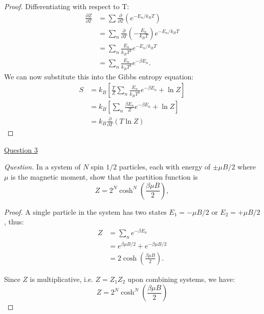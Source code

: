 \documentclass[11pt]{article}
\begin{document}
\begin{proof}
Differentiating with respect to T:
\begin{equation}
    \begin{aligned}
        \frac{\partial Z}{\partial T} &= \sum \frac{\partial}{\partial T} (e^{-E_n/k_BT})\\
        &= \sum_n \frac{\partial }{\partial T} \left(- \frac{E_n}{k_BT} \right)e^{- E_n/k_B T}\\
        &= \sum_n \frac{E_n}{k_B T^2} e^{-E_n/k_BT} \\
        &= \sum_n \frac{E_n}{k_B T^2} e^{-\beta E_n}.
    \end{aligned}
\end{equation}
\newpage
We can now substitute this into the Gibbs entropy equation:
\begin{equation}
    \begin{aligned}
        S &= k_B \left[\frac{T}{Z} \sum_n \frac{E_n}{k_B T^2} e^{-\beta E_n} + \ln Z\right] \\
        &= k_B \left[ \sum_n \frac{\beta E_n}{Z} e^{-\beta E_n} + \ln Z\right] \\
        & = k_B \frac{\partial}{\partial T} (T \ln Z)        
    \end{aligned}
\end{equation}
\end{proof}

\underline{Question 3}

\textit{Question.} In a system of $N$ spin $1/2$ particles, each with energy of $\pm \mu B/2$ where $\mu$ is the magnetic moment, show that the partition function is
\begin{equation}
    Z = 2^N \cosh^N\left(\frac{\beta \mu B}{2}\right),
\end{equation}
\begin{proof}
    A single particle in the system has two states $E_1 = -\mu B/2$ or $E_2 =+\mu B/2$, thus:
    \begin{equation}
        \begin{aligned}
            Z &= \sum_ne^{-\beta E_n} \\
            &= e^{\beta \mu B/2} + e^{-\beta \mu B/2} \\
            &= 2 \cosh \left(\frac{\beta \mu B}{2}\right).
        \end{aligned}
    \end{equation}

    Since $Z$ is multiplicative, i.e. $Z = Z_1Z_2$ upon combining systems, we have:
    \begin{equation}
        Z = 2^N \cosh^N\left(\frac{\beta \mu B}{2}\right)
    \end{equation}
\end{proof}
\end{document}
